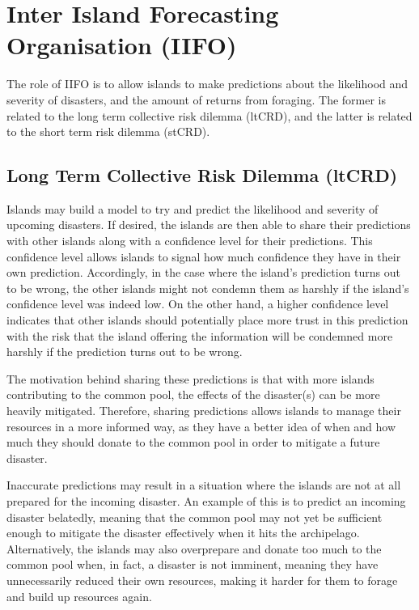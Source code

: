 \chapter{Inter Island Forecasting Organisation (IIFO)}

The role of IIFO is to allow islands to make predictions about the likelihood and severity of disasters, and the amount of returns from foraging. The former is related to the long term collective risk dilemma (ltCRD), and the latter is related to the short term risk dilemma (stCRD).

\section{Long Term Collective Risk Dilemma (ltCRD)}
\label{sec:IIFO:ltCRD}

Islands may build a model to try and predict the likelihood and severity of upcoming disasters. If desired, the islands are then able to share their predictions with other islands along with a confidence level for their predictions. This confidence level allows islands to signal how much confidence they have in their own prediction. Accordingly, in the case where the island's prediction turns out to be wrong, the other islands might not condemn them as harshly if the island's confidence level was indeed low. On the other hand, a higher confidence level indicates that other islands should potentially place more trust in this prediction with the risk that the island offering the information will be condemned more harshly if the prediction turns out to be wrong.

The motivation behind sharing these predictions is that with more islands contributing to the common pool, the effects of the disaster(s) can be more heavily mitigated. Therefore, sharing predictions allows islands to manage their resources in a more informed way, as they have a better idea of when and how much they should donate to the common pool in order to mitigate a future disaster.

Inaccurate predictions may result in a situation where the islands are not at all prepared for the incoming disaster. An example of this is to predict an incoming disaster belatedly, meaning that the common pool may not yet be sufficient enough to mitigate the disaster effectively when it hits the archipelago. Alternatively, the islands may also overprepare and donate too much to the common pool when, in fact, a disaster is not imminent, meaning they have unnecessarily reduced their own resources, making it harder for them to forage and build up resources again.

